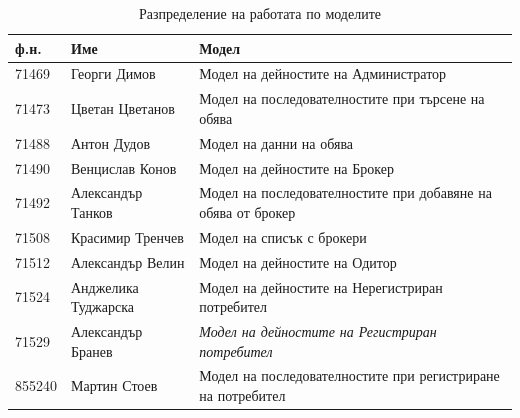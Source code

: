 \documentclass[]{article}
\begin{document}
\begin{table}[h]
\centering
\caption{Разпределение на работата по моделите}
\label{my-label}
\begin{tabular}{|l|l|l|}
\hline
\textbf{ф.н.} & \textbf{Име}        & \textbf{Модел}                                               \\ \hline
71469         & Георги Димов        & Модел на дейностите на Администратор                         \\ \hline
71473         & Цветан Цветанов     & Модел на последователностите при търсене на обява            \\ \hline
71488         & Антон Дудов         & Модел на данни на обява                                      \\ \hline
71490         & Венцислав Конов     & Модел на дейностите на Брокер                                \\ \hline
71492         & Александър Танков   & Модел на последователностите при добавяне на обява от брокер \\ \hline
71508         & Красимир Тренчев    & Модел на списък с брокери                                    \\ \hline
71512         & Александър Велин    & Модел на дейностите на Одитор                                \\ \hline
71524         & Анджелика Туджарска & Модел на дейностите на Нерегистриран потребител              \\ \hline
71529         & Александър Бранев   & \textit{Модел на дейностите на Регистриран потребител}       \\ \hline
855240        & Мартин Стоев        & Модел на последователностите при регистриране на потребител  \\ \hline
\end{tabular}
\end{table}
\end{document}
